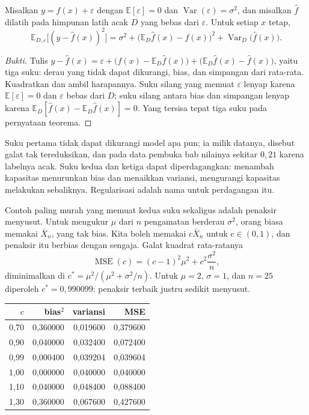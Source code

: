\begin{teorema}
Misalkan $y=f(x)+\varepsilon$ dengan $\mathbb{E}[\varepsilon]=0$ dan
$\operatorname{Var}(\varepsilon)=\sigma^2$, dan misalkan $\hat f$ dilatih pada
himpunan latih acak $D$ yang bebas dari $\varepsilon$. Untuk setiap $x$ tetap,
\[
\mathbb{E}_{D,\varepsilon}\bigl[(y-\hat f(x))^2\bigr]
=\sigma^2
+\bigl(\mathbb{E}_D\hat f(x)-f(x)\bigr)^2
+\operatorname{Var}_D\bigl(\hat f(x)\bigr).
\]
\end{teorema}

\begin{proof}[Bukti]
Tulis $y-\hat f(x)=\varepsilon+\bigl(f(x)-\mathbb{E}_D\hat f(x)\bigr)
+\bigl(\mathbb{E}_D\hat f(x)-\hat f(x)\bigr)$, yaitu tiga suku: derau yang tidak dapat
dikurangi, bias, dan simpangan dari rata-rata. Kuadratkan dan ambil harapannya. Suku
silang yang memuat $\varepsilon$ lenyap karena $\mathbb{E}[\varepsilon]=0$ dan
$\varepsilon$ bebas dari $D$; suku silang antara bias dan simpangan lenyap karena
$\mathbb{E}_D[\hat f(x)-\mathbb{E}_D\hat f(x)]=0$. Yang tersisa tepat tiga suku pada
pernyataan teorema.
\end{proof}

Suku pertama tidak dapat dikurangi model apa pun; ia milik datanya, disebut galat tak
tereduksikan, dan pada data pembuka bab nilainya sekitar $0{,}21$ karena labelnya acak.
Suku kedua dan ketiga dapat diperdagangkan: menambah kapasitas menurunkan bias dan
menaikkan variansi, mengurangi kapasitas melakukan sebaliknya. Regularisasi adalah nama
untuk perdagangan itu.

Contoh paling murah yang memuat kedua suku sekaligus adalah penaksir menyusut. Untuk
mengukur $\mu$ dari $n$ pengamatan berderau $\sigma^2$, orang biasa memakai
$\bar X_n$, yang tak bias. Kita boleh memakai $c\bar X_n$ untuk $c\in(0,1)$, dan
penaksir itu berbias dengan sengaja. Galat kuadrat rata-ratanya
\[
\operatorname{MSE}(c)=(c-1)^2\mu^2+c^2\frac{\sigma^2}{n},
\]
diminimalkan di $c^\ast=\mu^2/(\mu^2+\sigma^2/n)$. Untuk $\mu=2$, $\sigma=1$, dan
$n=25$ diperoleh $c^\ast=0{,}990099$: penaksir terbaik justru sedikit menyusut.

\begin{center}
\small
\begin{tabular}{rrrr}
\hline
$c$ & bias$^2$ & variansi & MSE \\
\hline
0,70 & 0,360000 & 0,019600 & 0,379600 \\
0,90 & 0,040000 & 0,032400 & 0,072400 \\
0,99 & 0,000400 & 0,039204 & 0,039604 \\
1,00 & 0,000000 & 0,040000 & 0,040000 \\
1,10 & 0,040000 & 0,048400 & 0,088400 \\
1,30 & 0,360000 & 0,067600 & 0,427600 \\
\hline
\end{tabular}
\end{center}

